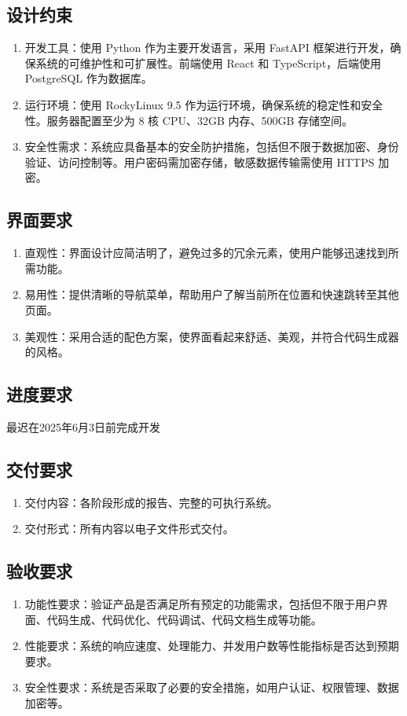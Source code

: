 \documentclass[
    report,     %
    oneside,    %
    UTF8,       %
    zihao=-4    %
]{config} %
\begin{document}
\subsection{设计约束}

\begin{enumerate}[label=(\arabic*)]
    \item 开发工具：使用 Python 作为主要开发语言，采用 FastAPI 框架进行开发，确保系统的可维护性和可扩展性。前端使用 React 和 TypeScript，后端使用 PostgreSQL 作为数据库。
    \item 运行环境：使用 RockyLinux 9.5 作为运行环境，确保系统的稳定性和安全性。服务器配置至少为 8 核 CPU、32GB 内存、500GB 存储空间。
    \item 安全性需求：系统应具备基本的安全防护措施，包括但不限于数据加密、身份验证、访问控制等。用户密码需加密存储，敏感数据传输需使用 HTTPS 加密。
\end{enumerate}
\subsection{界面要求}
\begin{enumerate}[label=(\arabic*)]
    \item 直观性：界面设计应简洁明了，避免过多的冗余元素，使用户能够迅速找到所需功能。
    \item 易用性：提供清晰的导航菜单，帮助用户了解当前所在位置和快速跳转至其他页面。
    \item 美观性：采用合适的配色方案，使界面看起来舒适、美观，并符合代码生成器的风格。
\end{enumerate}
\subsection{进度要求}
最迟在2025年6月3日前完成开发
\subsection{交付要求}
\begin{enumerate}[label=(\arabic*)]
    \item 交付内容：各阶段形成的报告、完整的可执行系统。
    \item 交付形式：所有内容以电子文件形式交付。
\end{enumerate}
\subsection{验收要求}
\begin{enumerate}[label=(\arabic*)]
    \item 功能性要求：验证产品是否满足所有预定的功能需求，包括但不限于用户界面、代码生成、代码优化、代码调试、代码文档生成等功能。
    \item 性能要求：系统的响应速度、处理能力、并发用户数等性能指标是否达到预期要求。
    \item 安全性要求：系统是否采取了必要的安全措施，如用户认证、权限管理、数据加密等。
\end{enumerate}
\end{document}
